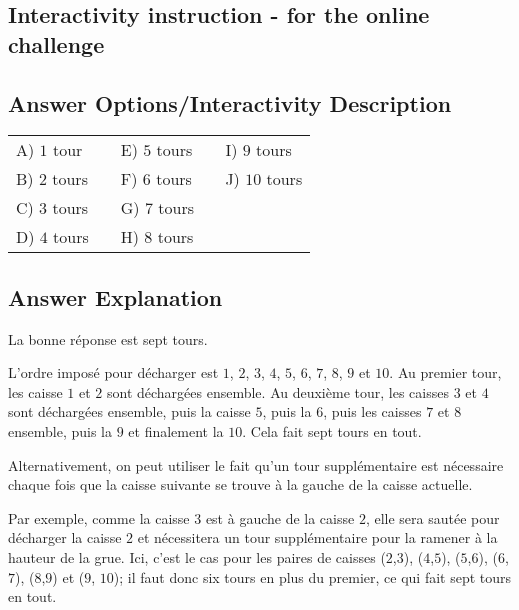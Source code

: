 \documentclass[a4paper,11pt]{report}
\newcommand{\taskGraphicsFolder}{..}
\begin{document}
\subsection*{Interactivity instruction - for the online challenge}

\begingroup
\renewcommand{\arraystretch}{1.5}
\subsection*{Answer Options/Interactivity Description}

\begin{tabular}{ @{} l l l @{} }
  A) $1$ tour & E) $5$ tours & I) $9$ tours \\ 
  B) $2$ tours & F) $6$ tours & J) $10$ tours \\ 
  C) $3$ tours & G) $7$ tours &  \\ 
  D) $4$ tours ${~~~}$ & H) $8$ tours ${~~~}$ & 
\end{tabular}

\endgroup

\subsection*{Answer Explanation}

La bonne réponse est sept tours.

L’ordre imposé pour décharger est $1$, $2$, $3$, $4$, $5$, $6$, $7$, $8$, $9$ et $10$. Au premier tour, les caisse $1$ et $2$ sont déchargées ensemble. Au deuxième tour, les caisses $3$ et $4$ sont déchargées ensemble, puis la caisse $5$, puis la $6$, puis les caisses $7$ et $8$ ensemble, puis la $9$ et finalement la $10$. Cela fait sept tours en tout.

Alternativement, on peut utiliser le fait qu’un tour supplémentaire est nécessaire chaque fois que la caisse suivante se trouve à la gauche de la caisse actuelle.

{\centering%
\par}

Par exemple, comme la caisse $3$ est à gauche de la caisse $2$, elle sera sautée pour décharger la caisse $2$ et nécessitera un tour supplémentaire pour la ramener à la hauteur de la grue. Ici, c’est le cas pour les paires de caisses ($2$,$3$), ($4$,$5$), ($5$,$6$), ($6$,$7$), ($8$,$9$) et ($9$, $10$); il faut donc six tours en plus du premier, ce qui fait sept tours en tout.
\end{document}
